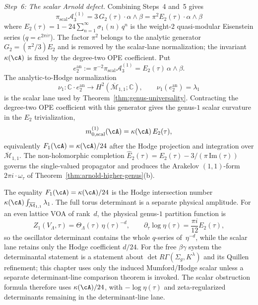\emph{Step~6: The scalar Arnold defect.}
Combining Steps~4 and~5 gives
\begin{equation}\label{eq:arnold-defect-genus1}
\boxed{
\pi_{\mathrm{scal}}\mathcal{A}_3^{(1)}
= 3\,G_2(\tau) \cdot \alpha \wedge \beta
= \pi^2 E_2(\tau) \cdot \alpha \wedge \beta
}
\end{equation}
where $E_2(\tau) = 1 - 24\sum_{n=1}^\infty \sigma_1(n)\,q^n$
is the weight-$2$ quasi-modular Eisenstein series
($q = e^{2\pi i \tau}$).
The factor $\pi^2$ belongs to the analytic generator
$G_2=(\pi^2/3)E_2$ and is removed by the scalar-lane normalization;
the invariant $\kappa(\cA)$ is fixed by the degree-two OPE
coefficient.  Put
\[
e_2^{\mathrm{an}}
:=\pi^{-2}\pi_{\mathrm{scal}}\mathcal{A}_3^{(1)}
=E_2(\tau)\,\alpha\wedge\beta .
\]
The analytic-to-Hodge normalization
\[
\nu_1\colon \mathbb C\cdot e_2^{\mathrm{an}}
\longrightarrow H^2(\overline{\mathcal M}_{1,1};\mathbb C),
\qquad
\nu_1(e_2^{\mathrm{an}})=\lambda_1
\]
is the scalar lane used by Theorem~\ref{thm:genus-universality}.
Contracting the degree-two OPE coefficient with this generator gives
the genus-$1$ scalar curvature in the $E_2$ trivialization,
\[
m_{0,\mathrm{scal}}^{(1)}(\cA)=\kappa(\cA)\,E_2(\tau),
\]
equivalently $F_1(\cA)=\kappa(\cA)/24$ after the Hodge projection and
integration over $\overline{\mathcal M}_{1,1}$.
The non-holomorphic completion $\hat{E}_2(\tau) = E_2(\tau)
- 3/(\pi\,\mathrm{Im}(\tau))$ governs the single-valued
propagator and produces the Arakelov $(1,1)$-form
$2\pi i \cdot \omega_\tau$ of
Theorem~\ref{thm:arnold-higher-genus}(b).

\begin{remark}
\label{rem:qc-scalar-one-loop-vs-determinant}
The equality $F_1(\cA)=\kappa(\cA)/24$ is the Hodge intersection
number $\kappa(\cA)\int_{\overline{\mathcal M}_{1,1}}\lambda_1$.
The full torus determinant is a separate physical amplitude.  For an
even lattice VOA of rank~$d$, the physical genus-$1$ partition
function is
\[
 Z_1(V_\Lambda,\tau)=\Theta_\Lambda(\tau)\,\eta(\tau)^{-d},
 \qquad
 \partial_\tau\log\eta(\tau)=\frac{\pi i}{12}E_2(\tau),
\]
so the oscillator determinant contains the whole
$q$-series of~$\eta^{-d}$, while the scalar lane retains only the
Hodge coefficient $d/24$.  For the free $\beta\gamma$ system the
determinantal statement is a statement about
$\det R\Gamma(\Sigma_g,K^\lambda)$ and its Quillen refinement; this
chapter uses only the induced Mumford/Hodge scalar unless a separate
determinant-line comparison theorem is invoked.  The scalar
obstruction formula therefore uses $\kappa(\cA)/24$, with
$-\log\eta(\tau)$ and zeta-regularized determinants remaining in the
determinant-line lane.
\end{remark}

